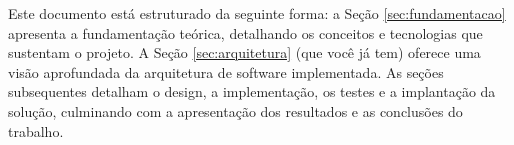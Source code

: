 Este documento está estruturado da seguinte forma: a Seção \ref{sec:fundamentacao} apresenta a fundamentação teórica, detalhando os conceitos e tecnologias que sustentam o projeto. A Seção \ref{sec:arquitetura} (que você já tem) oferece uma visão aprofundada da arquitetura de software implementada. As seções subsequentes detalham o design, a implementação, os testes e a implantação da solução, culminando com a apresentação dos resultados e as conclusões do trabalho.
